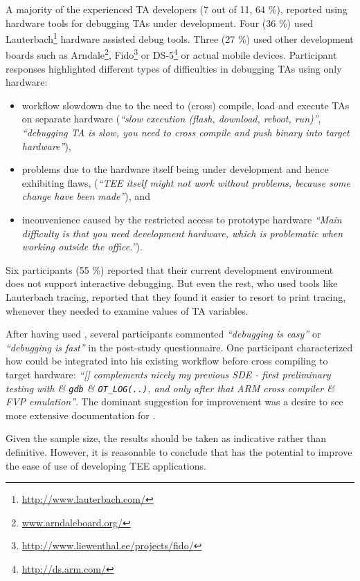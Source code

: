 \documentclass[10pt,conference,letterpaper]{IEEEtran}
\newcommand{\opentee}{\protect{TEE-Vi}\xspace}
\newcommand{\opentee}{\protect{Open-TEE}\xspace}
\begin{document}
A majority of the experienced TA developers (7 out of 11, 64 \%),
reported using hardware tools for debugging TAs under
development. Four (36 \%) used
Lauterbach\footnote{\url{http://www.lauterbach.com/}} hardware
assisted debug tools. Three (27 \%) used other development boards such
as Arndale\footnote{\url{www.arndaleboard.org/}},
Fido\footnote{\url{http://www.liewenthal.ee/projects/fido/}} or
DS-5\footnote{\url{http://ds.arm.com/}} or actual mobile
devices. Participant responses highlighted different types of difficulties in
debugging TAs using only hardware:
\begin{itemize}
\itemsep0em
\item workflow slowdown due to the need to (cross) compile, load and
  execute TAs on separate hardware (\textit{``slow execution (flash,
    download, reboot, run)''}, \textit{``debugging TA is slow, you
    need to cross compile and push binary into target hardware''}),
\item problems due to the hardware itself being under development and
  hence exhibiting flaws, (\textit{``TEE itself might not work without
    problems, because some change have been made''}), and
\item inconvenience caused by the restricted access to prototype
  hardware \textit{``Main difficulty is that you need development
    hardware, which is problematic when working outside the
    office.''}).
\end{itemize}
Six participants (55 \%) reported that their current development
environment does not support interactive debugging. But even the rest,
who used tools like Lauterbach tracing, reported
that they found it easier to resort to print tracing,
whenever they needed to examine values of TA variables.

After having used \opentee, several participants commented
\textit{``debugging is easy''} or \textit{``debugging is fast''} in
the post-study questionnaire. One participant characterized how
\opentee could be integrated into his existing workflow before
cross compiling to target hardware: \textit{``[\opentee] complements
nicely my previous SDE - first preliminary testing with \opentee \&
\texttt{gdb} \& \texttt{OT\_LOG(..)}, and only after that ARM cross
compiler \& FVP emulation''}. The dominant suggestion for
improvement was a desire to see more extensive documentation for
\opentee.


Given the sample size, the results should be taken as indicative
rather than definitive. However, it is reasonable to conclude that
\opentee has the potential to improve the ease of use of developing
TEE applications.
\fi
 
\end{document}
